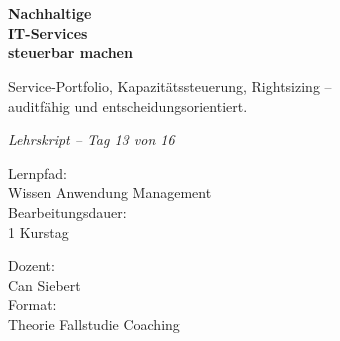 \documentclass[11pt,a4paper,oneside]{article}
\newcommand{\caveatfontfallback}{\itshape}
\newcommand\caveatfont{\caveatfontfallback}%
\begin{document}
\begin{titlepage}
  \pagestyle{empty}
  \vspace*{1.5cm}
  \\[2pt]
  \noindent{\color{lpAccent}\rule{\linewidth}{1.2pt}}\\[4pt]

  \vspace{3cm}
  {\sffamily\fontsize{30}{34}\selectfont\bfseries\color{lpInk}Nachhaltige\\IT-Services\\steuerbar machen\par}

  \vspace{0.7cm}
  {\sffamily\large\color{lpGray}Service-Portfolio, Kapazitätssteuerung, Rightsizing --\\auditfähig und entscheidungsorientiert.\par}

  \vspace{1.5cm}
  {\caveatfont\LARGE\color{lpAmber}Lehrskript -- Tag 13 von 16}\par

  \vfill

  \noindent\begin{minipage}{0.55\linewidth}
    {\sffamily\footnotesize\color{lpGray}Lernpfad:}\\
    {\sffamily\small\color{lpInk}Wissen \textrightarrow{} Anwendung \textrightarrow{} Management}\\[10pt]
    {\sffamily\footnotesize\color{lpGray}Bearbeitungsdauer:}\\
    {\sffamily\small\color{lpInk}1 Kurstag}
  \end{minipage}\hfill
  \begin{minipage}{0.4\linewidth}
    \raggedleft
    {\sffamily\footnotesize\color{lpGray}Dozent:}\\
    {\sffamily\small\color{lpInk}Can Siebert}\\[10pt]
    {\sffamily\footnotesize\color{lpGray}Format:}\\
    {\sffamily\small\color{lpInk}Theorie \textperiodcentered{} Fallstudie \textperiodcentered{} Coaching}
  \end{minipage}

  \vspace{0.5cm}
  \noindent{\color{lpAccent}\rule{\linewidth}{0.6pt}}
\end{titlepage}
\end{document}
